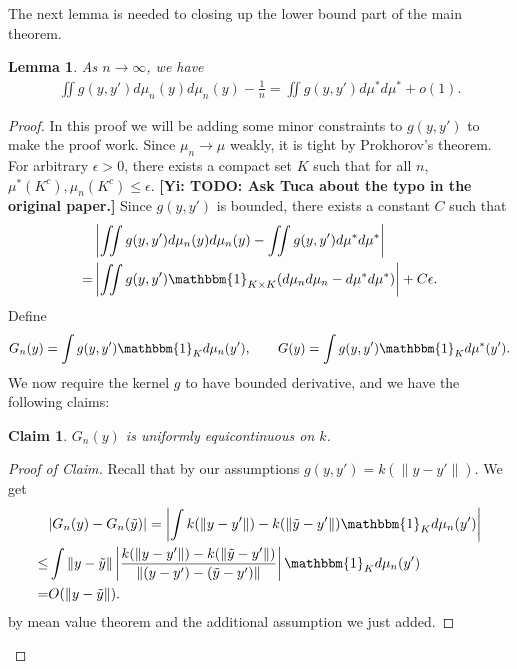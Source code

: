\documentclass[10pt]{article}
\newcommand{\norm}[1]{\left\lVert#1\right\rVert}
\newcommand{\gy}[1]{\textbf{\color{red}[Yi: #1]}}
\newtheorem{lemma}{\bf Lemma}
\newtheorem{claim}{\bf Claim}
\newenvironment{Proof of lemma}{\noindent{\bf Proof of Lemma}}{\hfill$\Box$\newline}
\newenvironment{Proof of claim}{\noindent{\bf Proof of claim}}{\hfill$\Box$\newline}
\newenvironment{Proof of theorem}{\noindent{\bf Proof of Theorem}}{\hfill\scriptsize{$\Box$}\newline}
\newenvironment{Proof of theorems}{\noindent{\bf Proof of Theorems}}{\hfill$\Box$\newline}
\newenvironment{Proof of proposition}{\noindent{\bf Proof of Proposition}}{\hfill$\Box$\newline}
\newenvironment{Proof of propositions}{\noindent{\bf Proof of Propositions}}{\hfill$\Box$\newline}
\newenvironment{Proof of exercise}{\noindent{\it Proof of Exercise:}}{\hfill$\Box$}
\numberwithin{equation}{section}
\begin{document}
The next lemma is needed to closing up the lower bound part of the main theorem.
\begin{lemma} \label{output_kernel_int_lemma}
    As $n \to \infty$, we have
    \begin{align}
        \iint g(y,y')d\mu_n(y) d\mu_n(y) - \frac{1}{n} = \iint g(y,y')d\mu^* d\mu^* + o(1).
    \end{align}
\end{lemma}
\begin{proof}
    In this proof we will be adding some minor constraints to $g(y,y')$ to make the proof work. Since $\mu_n \to \mu$ weakly, it is tight by Prokhorov's theorem. For arbitrary $\epsilon >0$, there exists a compact set $K$ such that for all $n$, $\mu^*(K^c),\mu_n(K^c) \leq \epsilon$. \gy{TODO: Ask Tuca about the typo in the original paper.} Since $g(y,y')$ is bounded, there exists a constant $C$ such that
    \begin{align}
          & \left|\iint g(y,y')d\mu_n(y) d\mu_n(y) - \iint g(y,y')d\mu^* d\mu^*\right| \nonumber            \\
        = & \left|\iint g(y,y') \mathbbm{1}_{K \times K}(d\mu_n d\mu_n - d\mu^* d\mu^*)\right| + C\epsilon.
    \end{align}
    Define
    \begin{align}
        G_n(y) = \int g(y,y') \mathbbm{1}_K d\mu_n(y'), \qquad G(y) = \int g(y,y') \mathbbm{1}_K d\mu^*(y').
    \end{align}
    We now require the kernel $g$ to have bounded derivative, and we have the following claims:
    \begin{claim} \label{claim_1}
        $G_n(y)$ is uniformly equicontinuous on $k$.
    \end{claim}
    \begin{proof}[Proof of Claim]
        Recall that by our assumptions $g(y,y') = k(\norm{y-y'})$. We get
        \begin{align}
                 & |G_n(y)-G_n(\tilde{y})| = \left|\int k(\norm{y-y'}) - k(\norm{\tilde{y}-y'}) \mathbbm{1}_K d\mu_n(y')\right| \nonumber                              \\
            \leq & \int \norm{y-\tilde{y}}\left|\frac{k(\norm{y-y'}) - k(\norm{\tilde{y}-y'})}{\norm{(y-y')-(\tilde{y}-y')}} \right|\mathbbm{1}_K d\mu_n(y') \nonumber \\
            =    & O(\norm{y-\tilde{y}}).
        \end{align}
        by mean value theorem and the additional assumption we just added.

\end{proof}
\end{proof}
\end{document}
